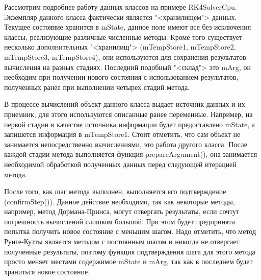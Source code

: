 \documentclass[a4paper, 14pt]{extarticle}
\theoremstyle{definition}
\begin{document}
\par Рассмотрим подробнее работу данных классов на примере RK4SolverCpu. Экземпляр данного класса фактически является "<хранилищем"> данных. Текущее состояние хранится в mState, данное поле имеют все без исключения классы, реализующие различные численные методы. Кроме того существует несколько дополнительных "<хранилищ"> (mTempStore1, mTempStore2, mTempStore3, mTempStore4), они используются для сохранения результатов вычисления на разных стадиях. Последний подобный "<склад">  это mArg, он необходим при получении нового состояния с использованием результатов, полученных ранее при выполнении четырех стадий метода.

\par В процессе вычислений объект данного класса выдает источник данных и их приемник, для этого используются описанные ранее переменные. Например, на первой стадии в качестве источника информации будет предоставлено mState, а запишется информация в mTempStore1. Стоит отметить, что сам объект не занимается непосредственно вычислениями, это работа другого класса. После каждой стадии метода выполняется функция prepareArgument(), она занимается необходимой обработкой полученных данных перед следующей итерацией метода.

\par После того, как шаг метода выполнен, выполняется его подтверждение (confirmStep()). Данное действие необходимо, так как некоторые методы, например, метод Дормана-Принса, могут отвергать результаты, если сочтут погрешность вычислений слишком большой. При этом будет предпринята попытка получить новое состояние с меньшим шагом. Надо отметить, что метод Рунге-Кутты является методом с постоянным шагом и никогда не отвергает полученные результаты, поэтому функция подтверждения шага для этого метода просто меняет местами содержимое mState и mArg, так как в последнем будет храниться новое состояние.

\end{document}
